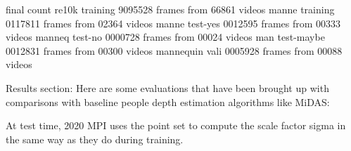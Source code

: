 final count 
re10k training 9095528 frames from 66861 videos 
manne training 0117811 frames from 02364 videos
manne test-yes 0012595 frames from 00333 videos
manneq test-no 0000728 frames from 00024 videos
man test-maybe 0012831 frames from 00300 videos
mannequin vali 0005928 frames from 00088 videos

Results section:
Here are some evaluations that have been brought up with comparisons with baseline people depth estimation algorithms like MiDAS:

At test time, 2020 MPI uses the point set to compute the scale factor sigma in the same way as they do during training.


    
  
    
    
    

    
    
